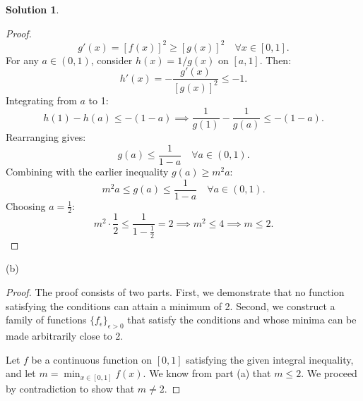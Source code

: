 \documentclass[12pt]{article}
\theoremstyle{definition}
\newtheorem*{solution}{\normalfont\textbf{Solution}}
\begin{document}
\begin{enumerate}[leftmargin=*]
\begin{solution}
\begin{proof}
            \[
            g'(x) = [f(x)]^2 \geq [g(x)]^2 \quad \forall x \in [0,1].
            \]
            For any \(a \in (0,1)\), consider \(h(x) = 1/g(x)\) on \([a,1]\). Then:
            \[
            h'(x) = -\frac{g'(x)}{[g(x)]^2} \leq -1.
            \]
            Integrating from \(a\) to 1:
            \[
            h(1) - h(a) \leq -(1 - a) \implies \frac{1}{g(1)} - \frac{1}{g(a)} \leq -(1 - a).
            \]
            Rearranging gives:
            \[
            g(a) \leq \frac{1}{1 - a} \quad \forall a \in (0,1).
            \]
            Combining with the earlier inequality \(g(a) \geq m^2 a\):
            \[
            m^2 a \leq g(a) \leq \frac{1}{1 - a} \quad \forall a \in (0,1).
            \]
            Choosing \(a = \frac{1}{2}\):
            \[
            m^2 \cdot \frac{1}{2} \leq \frac{1}{1 - \frac{1}{2}} = 2 \implies m^2 \leq 4 \implies m \leq 2.
            \]
            \end{proof}
        
        \item[(b)]
            \begin{proof}
            The proof consists of two parts. First, we demonstrate that no function satisfying the conditions can attain a minimum of 2. Second, we construct a family of functions $\{f_\epsilon\}_{\epsilon>0}$ that satisfy the conditions and whose minima can be made arbitrarily close to 2.


            Let \( f \) be a continuous function on \([0, 1]\) satisfying the given integral inequality, and let $m = \min_{x \in [0, 1]} f(x)$. We know from part (a) that $m \leq 2$. We proceed by contradiction to show that $m \neq 2$.


\end{proof}
\end{solution}
\end{enumerate}
\end{document}
